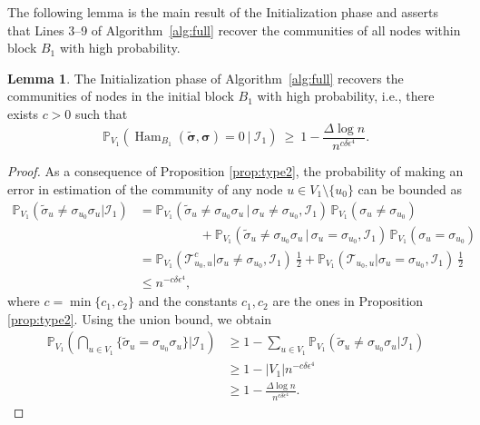 \documentclass[letterpaper,11pt]{article}
\newtheorem{lem}[thm]{Lemma}
\theoremstyle{definition}
\def\P{\mathbb{P}}
\newcommand{\hsigma}{\hat{\sigma}}
\newcommand{\tsigma}{\tilde{\sigma}}
\newcommand{\bsigma}{\bm{\sigma}}
\newcommand{\tbsigma}{\tilde{\bsigma}}
\def\cI{\mathcal{I}}
\def\cT{\mathcal{T}}
\def\wge{ \ \ge \ }
\numberwithin{equation}{section}
\newcommand{\eps}{\epsilon}
\newcommand{\la}{\lambda}
\newcommand{\Ham}{\operatorname{Ham}}
\newtheorem{lem}[thm]{Lemma}
\theoremstyle{definition}
\def\P{\mathbb{P}}
\newcommand{\hsigma}{\hat{\sigma}}
\newcommand{\tsigma}{\tilde{\sigma}}
\newcommand{\bsigma}{\bm{\sigma}}
\newcommand{\tbsigma}{\tilde{\bsigma}}
\def\cI{\mathcal{I}}
\def\cT{\mathcal{T}}
\def\wge{ \ \ge \ }
\numberwithin{equation}{section}
\newcommand{\eps}{\epsilon}
\newcommand{\la}{\lambda}
\newcommand{\Ham}{\operatorname{Ham}}
\theoremstyle{thmstyletwo}%
\begin{document}
The following lemma is the main result of the Initialization phase and asserts that Lines 3--9 of Algorithm~\ref{alg:full} recover the communities of all nodes within block $B_1$ with high probability. 

\begin{lem}
\label{lem:error_all_nodes_phase1}
The Initialization phase of Algorithm~\ref{alg:full} recovers the communities of nodes in the initial block $B_1$ with high probability, i.e., there exists $c>0$ such that
\[
\P_{V_1} \left(
\Ham_{B_1}(\tbsigma, \bsigma) = 0 \ \Big| \ \cI_1
\right)
\wge 1 - \frac{\Delta \log n}{ n^{c \delta \eps^4 }}.
\]
\end{lem}
\begin{proof} 
As a consequence of Proposition \ref{prop:type2}, the probability of making an error in estimation of the community of any node $u\in V_1\setminus \{u_0\}$ can be bounded as %
\begin{align*}
\P_{V_1}(\tsigma_u \ne \sigma_{u_0}\sigma_u|\cI_1) &=  \P_{V_1}(\tsigma_u \ne \sigma_{u_0} \sigma_u\,|\,\sigma_u\ne\sigma_{u_0},\cI_1)\,\P_{V_1}(\sigma_u\ne\sigma_{u_0})\\
&\hspace{2cm}+ \P_{V_1}(\tsigma_u \ne \sigma_{u_0} \sigma_u\,|\,\sigma_u=\sigma_{u_0},\cI_1)\,\P_{V_1}(\sigma_u=\sigma_{u_0})\\ 
&= \P_{V_1}(\cT_{u_0,u}^c|\sigma_u\ne\sigma_{u_0},\cI_1)\ \frac{1}{2}+ \P_{V_1}(\cT_{u_0,u}|\sigma_u=\sigma_{u_0},\cI_1)\ \frac{1}{2}\\
&\le n^{-c \delta \eps^4},
\end{align*}
where $c=\min \{c_1,c_2\}$ and the constants $c_1,c_2$ are the ones in Proposition \ref{prop:type2}. Using the union bound, we obtain
\begin{align*}
\P_{V_1}\left(\bigcap_{u \in V_1}\{\tsigma_u = \sigma_{u_0} \sigma_u\}\Big| \cI_1 \right)  %
&\ge 1-\sum_{u\in V_1}\P_{V_1}\left(\tsigma_u \ne \sigma_{u_0} \sigma_u\Big| \cI_1 \right) \\
&\ge 1- |V_1| n^{-c\delta \eps^4}\\
&\ge 1- \frac{\Delta\log n}{n^{c\delta \eps^4}}.
\end{align*}
\end{proof}
\end{document}
